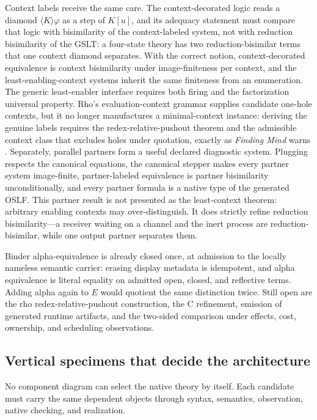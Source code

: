 \documentclass[11pt]{article}
\theoremstyle{definition}
\theoremstyle{remark}
\begin{document}
Context labels receive the same care.  The context-decorated logic reads a
diamond $\langle K\rangle\varphi$ as a step of $K[u]$, and its adequacy
statement must compare that logic with bisimilarity of the context-labeled
system, not with reduction bisimilarity of the GSLT: a four-state theory has
two reduction-bisimilar terms that one context diamond separates.  With the
correct notion, context-decorated equivalence is context bisimilarity under
image-finiteness per context, and the least-enabling-context systems inherit
the same finiteness from an enumeration.  The generic least-enabler interface
requires both firing and the factorization universal property.  Rho's
evaluation-context grammar supplies candidate one-hole contexts, but it no
longer manufactures a minimal-context instance: deriving the genuine labels
requires the redex-relative-pushout theorem and the admissible context class
that excludes holes under quotation, exactly as \emph{Finding Mind} warns
\cite{MeredithFindingMind}.  Separately, parallel partners form a useful
declared diagnostic system.  Plugging respects the canonical equations, the
canonical stepper makes every partner system image-finite, partner-labeled
equivalence is partner bisimilarity unconditionally, and every partner formula
is a native type of the generated OSLF.  This partner result is not presented
as the least-context theorem: arbitrary enabling contexts may over-distinguish.
It does strictly refine reduction bisimilarity---a receiver waiting on a
channel and the inert process are reduction-bisimilar, while one output partner
separates them.

Binder alpha-equivalence is already closed once, at admission to the locally
nameless semantic carrier: erasing display metadata is idempotent, and alpha
equivalence is literal equality on admitted open, closed, and reflective
terms.  Adding alpha again to $E$ would quotient the same distinction twice.
Still open are the rho redex-relative-pushout construction, the C refinement,
emission of generated runtime artifacts, and the two-sided comparison under
effects, cost, ownership, and scheduling observations.

\subsection{Vertical specimens that decide the architecture}

No component diagram can select the native theory by itself.  Each candidate
must carry the same dependent objects through syntax, semantics, observation,
native checking, and realization.
\end{document}
